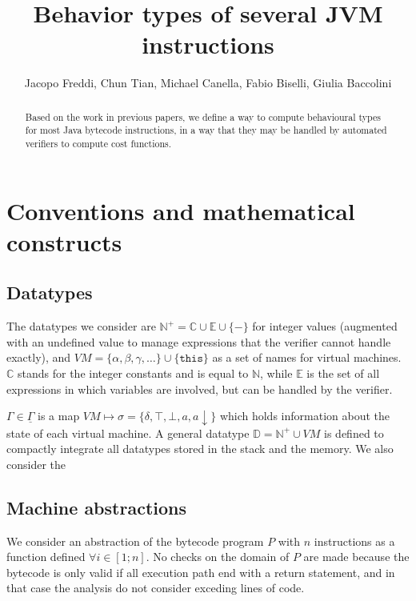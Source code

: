 \documentclass{amsart}
\newcommand{\N}{\mathbb{N}}
\newcommand{\E}{\mathbb{E}}
\newcommand{\C}{\mathbb{C}}
\newcommand{\data}{\mathbb{D}}
\newcommand{\down}[1]{#1\downarrow}
\newcommand{\Int}{\N^+}
\newcommand{\Gset}{\underline{\Gamma}}
\numberwithin{equation}{section}
\theoremstyle{plain} %
\theoremstyle{definition}
\theoremstyle{remark}
\begin{document}
\title{Behavior types of several JVM instructions}
\author{Jacopo Freddi, Chun Tian, Michael Canella, Fabio Biselli, Giulia Baccolini}




\maketitle

\begin{abstract}
Based on the work in previous papers, we define a way to compute behavioural types for most Java bytecode instructions, in a way that they may be handled by automated verifiers to compute cost functions.

\end{abstract}


\section{Conventions and mathematical constructs}


\subsection{Datatypes}
The datatypes we consider are $\Int{} = \C{} \cup \E{} \cup \{-\}$ for integer values (augmented with an undefined value to manage expressions that the verifier cannot handle exactly), and $VM = \{\alpha, \beta, \gamma, \dots\} \cup \{\texttt{this}\}$ as a set of names for virtual machines. $\C{}$ stands for the integer constants and is equal to $\N{}$, while $\E{}$ is the set of all expressions in which variables are involved, but can be handled by the verifier.

$\Gamma \in \Gset{}$ is a map $VM \mapsto \sigma = \{\delta, \top, \bot, a, \down{a}\}$ which holds information about the state of each virtual machine.
A general datatype $\data{} = \Int{} \cup VM$ is defined to compactly integrate all datatypes stored in the stack and the memory. We also consider the 

\subsection{Machine abstractions}
We consider an abstraction of the bytecode program $P$ with $n$ instructions as a function defined $\forall i \in [1 ; n]$. No checks on the domain of $P$ are made because the bytecode is only valid if all execution path end with a return statement, and in that case the analysis do not consider exceding lines of code.
\end{document}
